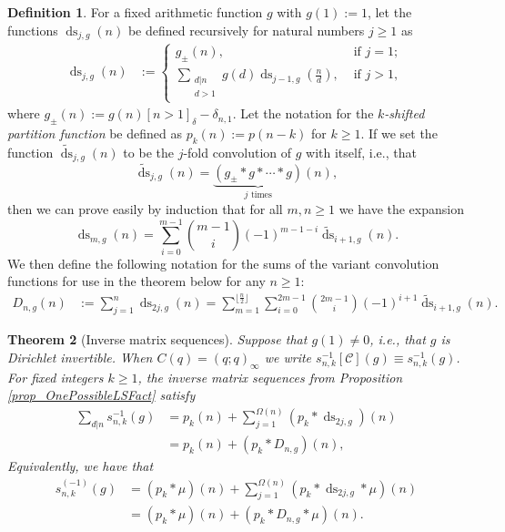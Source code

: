 \documentclass[12pt,reqno,a4letter]{article}
\numberwithin{figure}{section}
\numberwithin{table}{section}
\numberwithin{equation}{section}
\newcommand{\Iverson}[1]{\ensuremath{\left[#1\right]_{\delta}}}
\DeclareMathOperator{\ds}{ds}
\theoremstyle{plain}
\newtheorem{theorem}{Theorem}
\numberwithin{theorem}{section}
\theoremstyle{definition}
\newtheorem{definition}[theorem]{Definition}
\begin{document}
\begin{definition}
For a fixed arithmetic function $g$ with $g(1) := 1$, 
let the functions $\ds_{j,g}(n)$ be defined recursively for natural numbers 
$j \geq 1$ as 
\begin{align*} 
\ds_{j,g}(n) & := 
     \begin{cases} 
     g_{\pm}(n), & \text{ if $j = 1$; } \\ 
     \sum\limits_{\substack{d|n \\ d>1}} g(d) \ds_{j-1,g}\left(\frac{n}{d}\right), & \text{ if $j > 1$, } 
     \end{cases} 
\end{align*} 
where $g_{\pm}(n) := g(n) \Iverson{n > 1} - \delta_{n,1}$. 
Let the notation for the \emph{$k$-shifted partition function} be defined as 
$p_k(n) := p(n-k)$ for $k \geq 1$. If we set the function $\widetilde{\ds}_{j,g}(n)$ 
to be the $j$-fold convolution of $g$ with itself, i.e., that 
$$\widetilde{\ds}_{j,g}(n) = \underset{\text{$j$ times}}{\underbrace{\left(g_{\pm} \ast g \ast \cdots \ast g\right)}}(n),$$ 
then we can prove easily by induction that for all $m, n \geq 1$ we have the expansion 
$$\ds_{m,g}(n) = \sum_{i=0}^{m-1} \binom{m-1}{i} (-1)^{m-1-i} \widetilde{\ds}_{i+1,g}(n).$$ 
We then define the following notation for the sums of the variant convolution functions for 
use in the theorem below for any $n \geq 1$: 
\begin{align*} 
D_{n,g}(n) & := \sum_{j=1}^n \ds_{2j,g}(n) = \sum_{m=1}^{\lfloor \frac{n}{2} \rfloor} \sum_{i=0}^{2m-1} 
     \binom{2m-1}{i} (-1)^{i+1} \widetilde{\ds}_{i+1,g}(n). 
\end{align*}
\end{definition} 

\begin{theorem}[Inverse matrix sequences]
\label{claim_snk_inverses}
Suppose that $g(1) \neq 0$, i.e., that $g$ is Dirichlet invertible. 
When $C(q) = (q; q)_{\infty}$ we write $s_{n,k}^{-1}[\mathcal{C}](g) \equiv s_{n,k}^{-1}(g)$. 
For fixed integers $k \geq 1$, the inverse matrix sequences from Proposition \ref{prop_OnePossibleLSFact} satisfy 
\begin{align*} 
\sum_{d|n} s_{n,k}^{-1}(g) & = p_k(n) + \sum_{j=1}^{\Omega(n)} (p_k \ast \ds_{2j,g})(n) \\ 
     & = p_k(n) + (p_k \ast D_{n,g})(n), 
\end{align*} 
Equivalently, we have that 
\begin{align*} 
s_{n,k}^{(-1)}(g) & = (p_k \ast \mu)(n) + \sum_{j=1}^{\Omega(n)} (p_k \ast \ds_{2j,g} \ast \mu)(n) \\ 
     & = (p_k \ast \mu)(n) + (p_k \ast D_{n,g} \ast \mu)(n). 
\end{align*} 
\end{theorem} 
\end{document}
